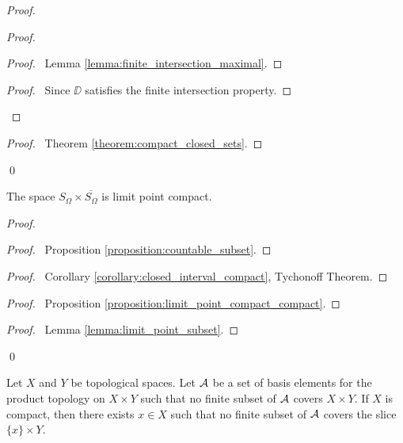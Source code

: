 \begin{proof}
\begin{proof}
\begin{proof}
            \pf\ Lemma \ref{lemma:finite_intersection_maximal}.
        \end{proof}
        \begin{proof}
            \pf\ Since $\DD$ satisfies the finite intersection property.
        \end{proof}
    \end{proof}
    \qedstep
    \begin{proof}
        \pf\ Theorem \ref{theorem:compact_closed_sets}.
    \end{proof}
    \qed
\end{proof}

\begin{example}
    The space $S_\Omega \times \overline{S_\Omega}$ is limit point compact.

\begin{proof}
    \pf
    \begin{proof}
        \pf\ Proposition \ref{proposition:countable_subset}.
    \end{proof}
    \begin{proof}
        \pf\ Corollary \ref{corollary:closed_interval_compact}, Tychonoff Theorem.
    \end{proof}
    \begin{proof}
        \pf\ Proposition \ref{proposition:limit_point_compact_compact}.
    \end{proof}
    \begin{proof}
        \pf\ Lemma \ref{lemma:limit_point_subset}.
    \end{proof}
    \qed
\end{proof}

\end{example}

\begin{lemma}
    \label{lemma:preTychonoff}
    Let $X$ and $Y$ be topological spaces.
    Let $\AA$ be a set of basis elements for the product topology on $X \times Y$ such that no finite subset of $\AA$ covers $X \times Y$.
    If $X$ is compact, then there exists $x \in X$ such that no finite subset of $\AA$ covers the slice $\{x\} \times Y$.
\end{lemma}

